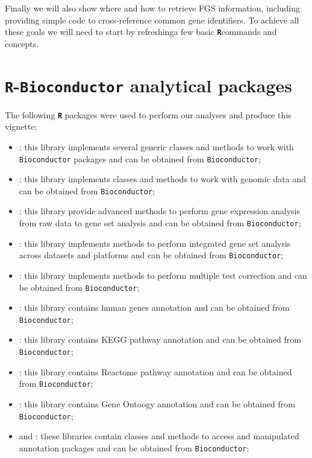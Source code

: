\documentclass[11pt]{article}
\newcommand{\software}[1]{\textsf{\texttt{#1}}}
\newcommand{\R}{\software{\bf R}}
\newcommand{\Bioc}{\software{Bioconductor}}
\newcommand{\Rcode}[1]{{\texttt{\color{BrickRed}{#1}}}}
\begin{document}
Finally we will also show where and how to retrieve FGS information, including
providing simple code to cross-reference common gene identifiers.
To achieve all these goals we will need to start by refreshinga few basic
\R commands and concepts.



\section{{\R}-{\Bioc} analytical packages}

The following {\R} packages were used to perform our analyses
and produce this vignette:
\begin{itemize}
  \item \Rcode{BiocGenerics}: this library implements several generic 
    classes and methods to work with {\Bioc} packages 
    and can be obtained from {\Bioc};
  \item \Rcode{Biobase}: this library implements classes and methods 
    to work with genomic data and can be obtained from {\Bioc};
  \item \Rcode{limma}: this library provide advanced methods to perform
    gene expression analysis from raw data to gene set analysis
    and can be obtained from {\Bioc};
  \item \Rcode{RTopper}: this library implements methods to perform
    integrated gene set analysis across datasets and platforms
    and can be obtained from {\Bioc};
  \item \Rcode{multtest}: this library implements methods to perform
    multiple test correction and can be obtained from {\Bioc};
  \item \Rcode{org.Hs.eg.db}: this library contains human genes annotation
    and can be obtained from {\Bioc};
  \item \Rcode{KEGG.db}: this library contains KEGG pathway annotation
    and can be obtained from {\Bioc};
  \item \Rcode{reactome.db}: this library contains Reactome pathway annotation
    and can be obtained from {\Bioc};
  \item \Rcode{GO.db}: this library contains Gene Ontoogy annotation
    and can be obtained from {\Bioc};
  \item \Rcode{AnnotationDBI} and \Rcode{annotate}:
    these libraries contain classes and methods
    to access and manipulated annotation packages 
    and can be obtained from {\Bioc};
\end{itemize}    
\end{document}
